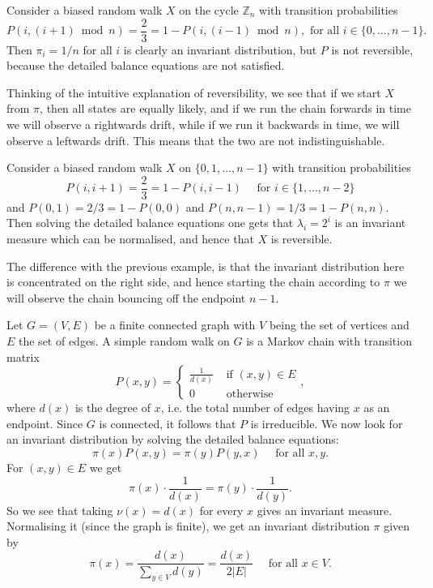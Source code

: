 \documentclass[a4paper]{article}
\begin{document}
\begin{example}
    Consider a biased random walk $X$ on the cycle $\mathbb{Z}_n$ with transition probabilities
    \[
    P(i,(i+1) \bmod n)=\frac{2}{3}=1-P(i,(i-1) \bmod n), \text { for all } i \in\{0, \ldots, n-1\} .
    \]
    Then $\pi_i=1 / n$ for all $i$ is clearly an invariant distribution, but $P$ is not reversible, because the detailed balance equations are not satisfied. 
    
    Thinking of the intuitive explanation of reversibility, we see that if we start $X$ from $\pi$, then all states are equally likely, and if we run the chain forwards in time we will observe a rightwards drift, while if we run it backwards in time, we will observe a leftwards drift. This means that the two are not indistinguishable.
\end{example}

\begin{example}
    Consider a biased random walk $X$ on $\{0,1, \ldots, n-1\}$ with transition probabilities
    \[
    P(i, i+1)=\frac{2}{3}=1-P(i, i-1) \quad \text { for } i \in\{1, \ldots, n-2\}
    \]
    and $P(0,1)=2 / 3=1-P(0,0)$ and $P(n, n-1)=1 / 3=1-P(n, n)$. Then solving the detailed balance equations one gets that $\lambda_i=2^i$ is an invariant measure which can be normalised, and hence that $X$ is reversible. 
    
    The difference with the previous example, is that the invariant distribution here is concentrated on the right side, and hence starting the chain according to $\pi$ we will observe the chain bouncing off the endpoint $n-1$.
\end{example}
\begin{example}
    Let $G=(V, E)$ be a finite connected graph with $V$ being the set of vertices and $E$ the set of edges. A simple random walk on $G$ is a Markov chain with transition matrix
    \[
    P(x, y)=\left\{\begin{array}{ll}
    \frac{1}{d(x)} & \text { if }(x, y) \in E \\
    0 & \text { otherwise }
    \end{array},\right.
    \]
    where $d(x)$ is the degree of $x$, i.e. the total number of edges having $x$ as an endpoint. Since $G$ is connected, it follows that $P$ is irreducible. We now look for an invariant distribution by solving the detailed balance equations:
    \[
    \pi(x) P(x, y)=\pi(y) P(y, x) \quad \text { for all } x, y .
    \]
    For $(x, y) \in E$ we get
    \[
    \pi(x) \cdot \frac{1}{d(x)}=\pi(y) \cdot \frac{1}{d(y)} .
    \]
    So we see that taking $\nu(x)=d(x)$ for every $x$ gives an invariant measure. Normalising it (since the graph is finite), we get an invariant distribution $\pi$ given by
    \[
    \pi(x)=\frac{d(x)}{\sum_{y \in V} d(y)}=\frac{d(x)}{2|E|} \quad \text { for all } x \in V .
    \]
\end{example}
\end{document}
